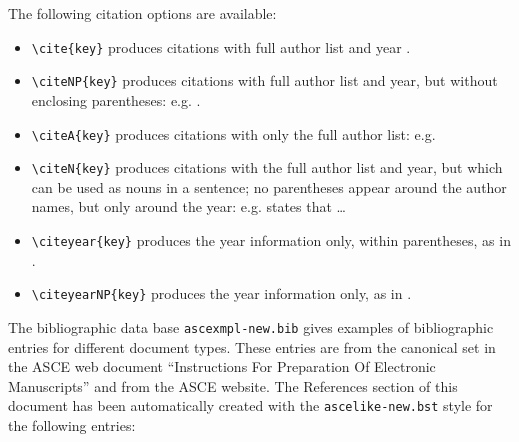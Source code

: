 \documentclass[Journal,letterpaper,NoLineNumbers]{ascelike-new}
\begin{document}
The following citation options are available:
\begin{itemize}
\item
\verb+\cite{key}+ produces citations with full author 
list and year \cite{Ireland:1954a}.
\item
\verb+\citeNP{key}+ produces citations with full author list and year, 
but without enclosing parentheses: e.g. .
\item
\verb+\citeA{key}+ produces citations with only the full 
author list: e.g. 
\item
\verb+\citeN{key}+ produces citations with the full author list and year, but
which can be used as nouns in a sentence; no parentheses appear around
the author names, but only around the year: e.g. 
states that \ldots
\item
\verb+\citeyear{key}+ produces the year information only, within parentheses,
as in \citeyear{Ireland:1954a}.
\item
\verb+\citeyearNP{key}+ produces the year information only,
as in .
\end{itemize}
%
\par
The bibliographic data base \texttt{ascexmpl-new.bib}
gives examples of bibliographic entries for different document types.
These entries are from the canonical set in the
ASCE web document ``Instructions For Preparation Of Electronic Manuscripts''
and from the ASCE website.
The References section of this document has been automatically created with
the \texttt{ascelike-new.bst} style for the following entries:
\end{document}
